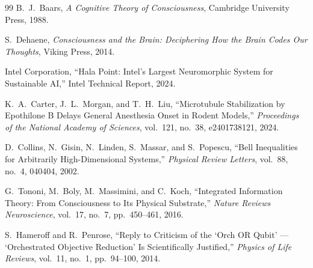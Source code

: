 \documentclass[12pt,a4paper]{article}
\begin{document}
\begin{thebibliography}{99}
B.~J.~Baars,
\emph{A Cognitive Theory of Consciousness},
Cambridge University Press, 1988.

S.~Dehaene,
\emph{Consciousness and the Brain: Deciphering How the Brain Codes Our
Thoughts},
Viking Press, 2014.

Intel Corporation,
``Hala Point: Intel's Largest Neuromorphic System for Sustainable AI,''
Intel Technical Report, 2024.

K.~A.~Carter, J.~L.~Morgan, and T.~H.~Liu,
``Microtubule Stabilization by Epothilone B Delays General Anesthesia
Onset in Rodent Models,''
\emph{Proceedings of the National Academy of Sciences}, vol.~121, no.~38,
e2401738121, 2024.

D.~Collins, N.~Gisin, N.~Linden, S.~Massar, and S.~Popescu,
``Bell Inequalities for Arbitrarily High-Dimensional Systems,''
\emph{Physical Review Letters}, vol.~88, no.~4, 040404, 2002.

G.~Tononi, M.~Boly, M.~Massimini, and C.~Koch,
``Integrated Information Theory: From Consciousness to Its Physical
Substrate,''
\emph{Nature Reviews Neuroscience}, vol.~17, no.~7, pp.~450--461, 2016.

S.~Hameroff and R.~Penrose,
``Reply to Criticism of the `Orch OR Qubit' --- `Orchestrated Objective
Reduction' Is Scientifically Justified,''
\emph{Physics of Life Reviews}, vol.~11, no.~1, pp.~94--100, 2014.

\end{thebibliography}
\end{document}
